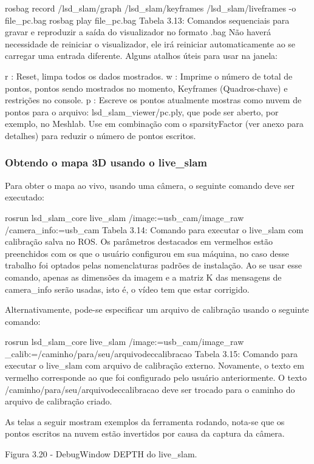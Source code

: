 rosbag record /lsd\_slam/graph /lsd\_slam/keyframes /lsd\_slam/liveframes -o file\_pc.bag
rosbag play file\_pc.bag
Tabela 3.13: Comandos sequenciais para gravar e reproduzir a saída do visualizador no formato .bag
Não haverá necessidade de reiniciar o visualizador, ele irá reiniciar automaticamente ao se carregar uma entrada diferente. Alguns atalhos úteis para usar na janela:

r : Reset, limpa todos os dados mostrados.
w : Imprime o número de total de pontos, pontos sendo mostrados no momento, Keyframes (Quadros-chave) e restrições no console.
p : Escreve os pontos atualmente mostras como nuvem de pontos para o arquivo: lsd\_slam\_viewer/pc.ply, que pode ser aberto, por exemplo, no Meshlab. Use  em combinação com o sparsityFactor (ver anexo para detalhes) para reduzir o número de pontos escritos.

\subsubsection{Obtendo o mapa 3D usando o live\_slam}

Para obter o mapa ao vivo, usando uma câmera, o seguinte comando deve ser executado:

rosrun lsd\_slam\_core live\_slam /image:=usb\_cam/image\_raw /camera\_info:=usb\_cam
Tabela 3.14: Comando para executar o live\_slam com calibração salva no ROS.
Os parâmetros destacados em vermelhos estão preenchidos com os que o usuário configurou em sua máquina, no caso desse trabalho foi optados pelas nomenclaturas padrões de instalação. Ao se usar esse comando, apenas as dimensões da imagem e a matriz K das mensagens de camera\_info serão usadas, isto é, o vídeo tem que estar corrigido.

Alternativamente, pode-se especificar um arquivo de calibração usando o seguinte comando:

rosrun lsd\_slam\_core live\_slam /image:=usb\_cam/image\_raw \_calib:=/caminho/para/seu/arquivodeccalibracao
Tabela 3.15: Comando para executar o live\_slam com arquivo de calibração externo.
Novamente, o texto em vermelho corresponde ao que foi configurado pelo usuário anteriormente. O texto /caminho/para/seu/arquivodeccalibracao deve ser trocado para o caminho do arquivo de calibração criado.

As telas a seguir mostram exemplos da ferramenta rodando, nota-se que os pontos escritos na nuvem estão invertidos por causa da captura da câmera. 

Figura 3.20 - DebugWindow DEPTH do live\_slam.

